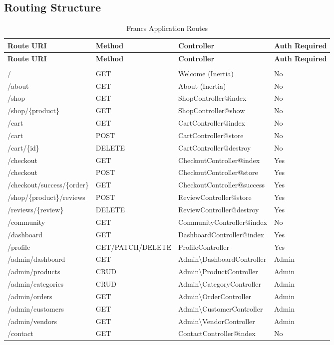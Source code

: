 \subsection{Routing Structure}
\renewcommand{\arraystretch}{1.3}
\begin{longtable}{|p{4cm}|p{2cm}|p{4cm}|p{3cm}|}
    \hline
    \textbf{Route URI} & \textbf{Method} & \textbf{Controller} & \textbf{Auth Required} \\
    \hline
    \endfirsthead
    \hline
    \textbf{Route URI} & \textbf{Method} & \textbf{Controller} & \textbf{Auth Required} \\
    \hline
    \endhead
    \hline
    \endfoot
    \hline
    \caption{Francs Application Routes} \label{tab:routes} \\
    \endlastfoot
    / & GET & Welcome (Inertia) & No \\
    \hline
    /about & GET & About (Inertia) & No \\
    \hline
    /shop & GET & ShopController@index & No \\
    \hline
    /shop/\{product\} & GET & ShopController@show & No \\
    \hline
    /cart & GET & CartController@index & No \\
    \hline
    /cart & POST & CartController@store & No \\
    \hline
    /cart/\{id\} & DELETE & CartController@destroy & No \\
    \hline
    /checkout & GET & CheckoutController@index & Yes \\
    \hline
    /checkout & POST & CheckoutController@store & Yes \\
    \hline
    /checkout/success/\{order\} & GET & CheckoutController@success & Yes \\
    \hline
    /shop/\{product\}/reviews & POST & ReviewController@store & Yes \\
    \hline
    /reviews/\{review\} & DELETE & ReviewController@destroy & Yes \\
    \hline
    /community & GET & CommunityController@index & No \\
    \hline
    /dashboard & GET & DashboardController@index & Yes \\
    \hline
    /profile & GET/PATCH/DELETE & ProfileController & Yes \\
    \hline
    /admin/dashboard & GET & Admin\textbackslash DashboardController & Admin \\
    \hline
    /admin/products & CRUD & Admin\textbackslash ProductController & Admin \\
    \hline
    /admin/categories & CRUD & Admin\textbackslash CategoryController & Admin \\
    \hline
    /admin/orders & GET & Admin\textbackslash OrderController & Admin \\
    \hline
    /admin/customers & GET & Admin\textbackslash CustomerController & Admin \\
    \hline
    /admin/vendors & GET & Admin\textbackslash VendorController & Admin \\
    \hline
    /contact & GET & ContactController@index & No \\
    \hline
\end{longtable}

